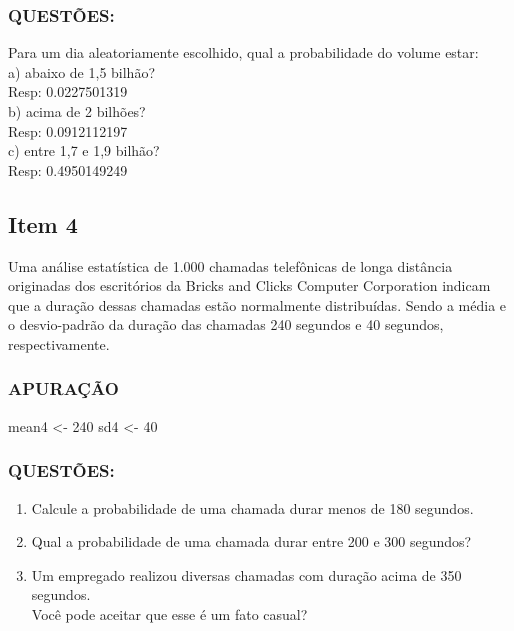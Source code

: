 \documentclass[
]{article}
\newenvironment{Shaded}{\begin{snugshade}}{\end{snugshade}}
\newcommand{\DecValTok}[1]{\textcolor[rgb]{0.00,0.00,0.81}{#1}}
\newcommand{\NormalTok}[1]{#1}
\newcommand{\OtherTok}[1]{\textcolor[rgb]{0.56,0.35,0.01}{#1}}
\providecommand{\tightlist}{%
  \setlength{\itemsep}{0pt}\setlength{\parskip}{0pt}}
\begin{document}
\hypertarget{questuxf5es-2}{%
\subsubsection{QUESTÕES:}\label{questuxf5es-2}}

Para um dia aleatoriamente escolhido, qual a probabilidade do volume
estar:\\
a) abaixo de 1,5 bilhão?\\
Resp: 0.0227501319\\
b) acima de 2 bilhões?\\
Resp: 0.0912112197\\
c) entre 1,7 e 1,9 bilhão?\\
Resp: 0.4950149249

\hypertarget{item-4}{%
\subsection{Item 4}\label{item-4}}

Uma análise estatística de 1.000 chamadas telefônicas de longa distância
originadas dos escritórios da Bricks and Clicks Computer Corporation
indicam que a duração dessas chamadas estão normalmente distribuídas.
Sendo a média e o desvio-padrão da duração das chamadas 240 segundos e
40 segundos, respectivamente.

\hypertarget{apurauxe7uxe3o-3}{%
\subsubsection{APURAÇÃO}\label{apurauxe7uxe3o-3}}

\begin{Shaded}
\begin{Highlighting}[]
\NormalTok{mean4 }\OtherTok{\textless{}{-}} \DecValTok{240}
\NormalTok{sd4 }\OtherTok{\textless{}{-}} \DecValTok{40}
\end{Highlighting}
\end{Shaded}

\hypertarget{questuxf5es-3}{%
\subsubsection{QUESTÕES:}\label{questuxf5es-3}}

\begin{enumerate}
\def\labelenumi{\alph{enumi})}
\tightlist
\item
  Calcule a probabilidade de uma chamada durar menos de 180 segundos.\\
\item
  Qual a probabilidade de uma chamada durar entre 200 e 300 segundos?\\
\item
  Um empregado realizou diversas chamadas com duração acima de 350
  segundos.\\
  Você pode aceitar que esse é um fato casual?
\end{enumerate}
\end{document}
